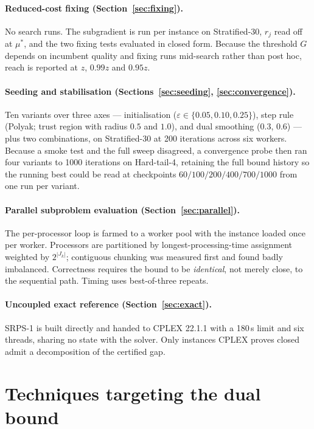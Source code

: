 \documentclass[11pt,a4paper]{article}
\begin{document}
\paragraph{Reduced-cost fixing (Section~\ref{sec:fixing}).}
No search runs. The subgradient is run per instance on Stratified-30, $r_j$ read
off at $\mu^\ast$, and the two fixing tests evaluated in closed form. Because the
threshold $G$ depends on incumbent quality and fixing runs mid-search rather than
post hoc, reach is reported at $z$, $0.99z$ and $0.95z$.

\paragraph{Seeding and stabilisation (Sections~\ref{sec:seeding},
\ref{sec:convergence}).}
Ten variants over three axes --- initialisation
($\varepsilon\in\{0.05,0.10,0.25\}$), step rule (Polyak; trust region with radius
$0.5$ and $1.0$), and dual smoothing ($0.3$, $0.6$) --- plus two combinations, on
Stratified-30 at 200 iterations across six workers. Because a smoke test and the
full sweep disagreed, a convergence probe then ran four variants to 1000
iterations on Hard-tail-4, retaining the full bound history so the running best
could be read at checkpoints $60/100/200/400/700/1000$ from one run per variant.

\paragraph{Parallel subproblem evaluation (Section~\ref{sec:parallel}).}
The per-processor loop is farmed to a worker pool with the instance loaded once
per worker. Processors are partitioned by longest-processing-time assignment
weighted by $2^{|J_k|}$; contiguous chunking was measured first and found badly
imbalanced. Correctness requires the bound to be \emph{identical}, not merely
close, to the sequential path. Timing uses best-of-three repeats.

\paragraph{Uncoupled exact reference (Section~\ref{sec:exact}).}
SRPS-1 is built directly and handed to CPLEX 22.1.1 with a 180\,s limit and six
threads, sharing no state with the solver. Only instances CPLEX proves closed
admit a decomposition of the certified gap.

\section{Techniques targeting the dual bound}\label{sec:dual}
\end{document}
